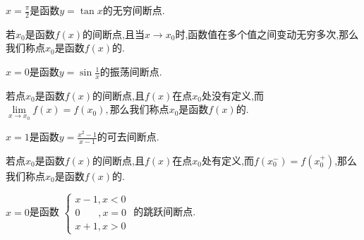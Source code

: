 \simpleexamples $\displaystyle x=\frac{\pi}{2}$是函数$y=\tan x$的无穷间断点.

若$x_0$是函数$f(x)$的间断点,且当$x \to x_0$时,函数值在多个值之间变动无穷多次,那么我们称点$x_0$是函数$f(x)$的.\jg

\simpleexamples $\displaystyle x = 0$是函数$\displaystyle y =\sin\frac{1}{x}$的振荡间断点.


若点$x_0$是函数$f(x)$的间断点,且$f(x)$在点$x_0$处没有定义,而$\lim\limits_{x \to x_0}f(x)=f(x_0),$那么我们称点$x_0$是函数$f(x)$的.\jg

\simpleexamples $\displaystyle x=1$是函数$\displaystyle y=\frac{x^2-1}{x-1}$的可去间断点.

若点$x_0$是函数$f(x)$的间断点,且$f(x)$在点$x_0$处有定义,而$f(x_0^-)=f(x_0^+)$,那么我们称点$x_0$是函数$f(x)$的.

\simpleexamples $\displaystyle x=0$是函数
$
\displaystyle
\begin{cases}
x-1,x<0\\
0\,\,\,\,\,\,\,\,\,\,\,,x=0\\
x+1,x>0
\end{cases}
$
的跳跃间断点.



